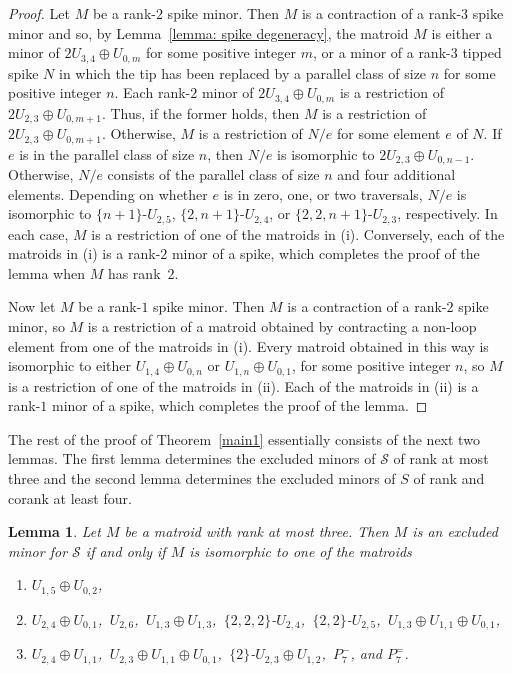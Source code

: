 \documentclass[11pt]{amsart}
\newtheorem{lemma}[theorem]{Lemma}
\numberwithin{equation}{section} %
\newcommand{\cS}{\mathcal{S}}
\begin{document}
\begin{proof}
Let $M$ be a rank-$2$ spike minor. Then $M$ is a contraction of a rank-$3$ spike minor and so, by Lemma~\ref{lemma: spike degeneracy}, the matroid $M$ is either a minor of $2U_{3, 4} \oplus U_{0,m}$ for some positive integer $m$, or a minor of a rank-$3$ tipped spike $N$ in which the tip has been replaced by a parallel class of size $n$ for some positive integer $n$. Each rank-$2$ minor of $2U_{3, 4} \oplus U_{0, m}$ is a restriction of $2U_{2, 3} \oplus U_{0, m+1}$. Thus, if the former holds, then $M$ is a restriction of $2U_{2,3} \oplus U_{0,m+1}$. Otherwise, $M$ is a restriction of $N / e$ for some element $e$ of $N$. If $e$ is in the parallel class of size $n$, then $N/e$ is isomorphic to $2U_{2, 3}\oplus U_{0, n-1}$. Otherwise, $N/e$ consists of the parallel class of size $n$ and four additional elements. Depending on whether $e$ is in zero, one, or two traversals, $N/e$ is isomorphic to $\{n+1\}$-$U_{2, 5}$, $\{2, n+1\}$-$U_{2, 4}$, or $\{2, 2, n+1\}$-$U_{2,3}$, respectively. In each case, $M$ is a restriction of one of the matroids in (i). Conversely, each of the matroids in (i) is a rank-$2$ minor of a spike, which completes the proof of the lemma when $M$ has rank~$2$.

Now let $M$ be a rank-$1$ spike minor. Then $M$ is a contraction of a rank-$2$ spike minor, so $M$ is a restriction of a matroid obtained by contracting a non-loop element from one of the matroids in (i). Every matroid obtained in this way is isomorphic to either $U_{1,4} \oplus U_{0,n}$ or $U_{1,n} \oplus U_{0,1}$, for some positive integer $n$, so $M$ is a restriction of one of the matroids in (ii). Each of the matroids in (ii) is a rank-$1$ minor of a spike, which completes the proof of the lemma.
\end{proof}

The rest of the proof of Theorem~\ref{main1} essentially consists of the next two lemmas. The first lemma determines the excluded minors of $\cS$ of rank at most three and the second lemma determines the excluded minors of $S$ of rank and corank at least four. 

\begin{lemma}
\label{lemma: small spike-minors}
Let $M$ be a matroid with rank at most three. Then $M$ is an excluded minor for $\cS$ if and only if $M$ is isomorphic to one of the matroids
\begin{enumerate}[{\rm (i)}]
\item $U_{1, 5}\oplus U_{0, 2}$,

\item $U_{2, 4}\oplus U_{0, 1}$,\, $U_{2, 6}$,\, $U_{1, 3}\oplus U_{1, 3}$,\, $\{2, 2, 2\}$-$U_{2, 4}$,\, $\{2, 2\}$-$U_{2, 5}$,\, $U_{1, 3}\oplus U_{1, 1}\oplus U_{0, 1}$,

\item $U_{2, 4}\oplus U_{1, 1}$,\, $U_{2, 3}\oplus U_{1, 1}\oplus U_{0, 1}$,\, $\{2\}$-$U_{2, 3}\oplus U_{1, 2}$,\, $P_7^-$, and $P_7^=$.
\end{enumerate}
\end{lemma}
\end{document}
